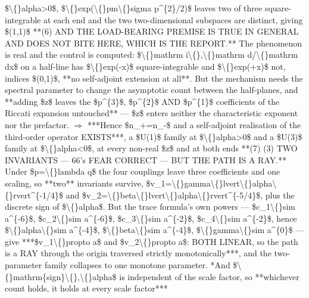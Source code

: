 \begin{description}
\$\textbackslash\{\}alpha>0\$, \$\textbackslash\{\}exp(\textbackslash\{\}pm\textbackslash\{\}sigma p\textasciicircum{}\{2\}/2)\$ leaves two of three square-integrable at each end and the two two-dimensional subspaces are distinct, giving \$(1,1)\$  **(6)  AND THE LOAD-BEARING PREMISE IS TRUE IN GENERAL AND DOES NOT BITE HERE, WHICH IS THE REPORT.** The phenomenon is real and the control is computed: \$\textbackslash\{\}mathrm i\textbackslash\{\},\textbackslash\{\}mathrm d/\textbackslash\{\}mathrm dx\$ on a half-line has \$\textbackslash\{\}exp(-x)\$ square-integrable and \$\textbackslash\{\}exp(+x)\$ not, indices \$(0,1)\$, **no self-adjoint extension at all**. But the mechanism needs the spectral parameter to change the asymptotic count between the half-planes, and **adding \$z\$ leaves the \$p\textasciicircum{}\{3\}\$, \$p\textasciicircum{}\{2\}\$ AND \$p\textasciicircum{}\{1\}\$ coefficients of the Riccati expansion untouched** --- \$z\$ enters neither the characteristic exponent nor the prefactor. \ensuremath{\Rightarrow} ***Hence \$n\_+=n\_-\$ and a self-adjoint realisation of the third-order operator EXISTS***, a \$U(1)\$ family at \$\textbackslash\{\}alpha>0\$ and a \$U(3)\$ family at \$\textbackslash\{\}alpha<0\$, at every non-real \$z\$ and at both ends  **(7) (3) TWO INVARIANTS --- 66's FEAR CORRECT --- BUT THE PATH IS A RAY.** Under \$p=\textbackslash\{\}lambda q\$ the four couplings leave three coefficients and one scaling, so **two** invariants survive, \$v\_1=\textbackslash\{\}gamma\textbackslash\{\}lvert\textbackslash\{\}alpha\textbackslash\{\}rvert\textasciicircum{}\{-1/4\}\$ and \$v\_2=\textbackslash\{\}beta\textbackslash\{\}lvert\textbackslash\{\}alpha\textbackslash\{\}rvert\textasciicircum{}\{-5/4\}\$, plus the discrete sign of \$\textbackslash\{\}alpha\$. But the trace formula's own powers --- \$c\_1\textbackslash\{\}sim a\textasciicircum{}\{-6\}\$, \$c\_2\textbackslash\{\}sim a\textasciicircum{}\{-6\}\$, \$c\_3\textbackslash\{\}sim a\textasciicircum{}\{-2\}\$, \$c\_4\textbackslash\{\}sim a\textasciicircum{}\{-2\}\$, hence \$\textbackslash\{\}alpha\textbackslash\{\}sim a\textasciicircum{}\{-4\}\$, \$\textbackslash\{\}beta\textbackslash\{\}sim a\textasciicircum{}\{-4\}\$, \$\textbackslash\{\}gamma\textbackslash\{\}sim a\textasciicircum{}\{0\}\$ --- give ***\$v\_1\textbackslash\{\}propto a\$ and \$v\_2\textbackslash\{\}propto a\$: BOTH LINEAR, so the path is a RAY through the origin traversed strictly monotonically***, and the two-parameter family collapses to one monotone parameter.  *And \$\textbackslash\{\}mathrm\{sign\}\textbackslash\{\},\textbackslash\{\}alpha\$ is independent of the scale factor, so **whichever count holds, it holds at every scale factor***

\end{description}
